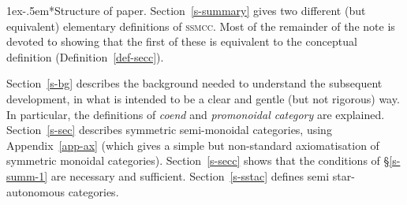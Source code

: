 \documentclass{robincs}
\makeatletter
\let\defn = \emph
\newenvironment{setoff}{\@startsection{paragraph}{4}{\z@}%
                {1ex}%
                {-.5em}%
                {\normalfont\normalsize\bfseries}*}
        {\vskip1ex\noindent\ignorespacesafterend}
\renewcommand\paragraph{\@startsection{paragraph}{4}{\z@}%
                {1ex}{-.5em}{\normalfont\normalsize\bfseries}}
\newcommand\ssmcs {symmetric semi-mon\-oid\-al categories\xspace}
\newcommand\ssmccs{symmetric semi-mon\-oid\-al closed categories\xspace}
\newcommand\sstacs{semi star-aut\-on\-om\-ous categories\xspace}
\newcommand\SECC {\textsc{ssmcc}\xspace}
\newcommand\SECCs{\textsc{ssmcc}s\xspace}
\newlength{\tw}\setlength{\tw}{\textwidth}\addtolength{\tw}{-\arrayrulewidth}
\makeatother
\begin{document}



\paragraph*{Structure of paper.}
Section~\ref{s-summary} gives two different (but equivalent)
elementary definitions of \SECC.  Most of the remainder of the note is
devoted to showing that the first of these is equivalent to the conceptual
definition (Definition~\ref{def-secc}).

Section~\ref{s-bg} describes the background needed to understand the
subsequent development, in what is intended to be a clear and gentle
(but not rigorous) way. In particular, the definitions of \emph{coend}
and \emph{promonoidal category} are explained.
%
Section~\ref{s-sec} describes \ssmcs, using
Appendix~\ref{app-ax} (which gives a simple but
non-standard axiomatisation of symmetric monoidal categories).
Section~\ref{s-secc} shows that the conditions of \S\ref{s-summ-1}
are necessary and sufficient.
Section~\ref{s-sstac} defines \sstacs.
\end{document}
